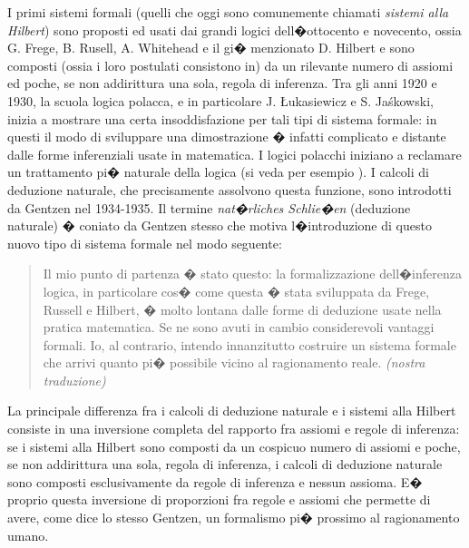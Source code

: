\documentclass[a4paper,12pt]{aphex}
\begin{document}
I primi sistemi formali (quelli che oggi sono comunemente chiamati \emph{sistemi alla Hilbert}) sono proposti ed usati dai grandi logici dell�ottocento e novecento, ossia G. Frege, B. Rusell, A. Whitehead e il gi� menzionato D. Hilbert e  sono composti (ossia i loro postulati consistono in) da un rilevante numero di assiomi ed poche, se non addirittura una sola, regola di inferenza. Tra gli anni 1920 e 1930, la scuola logica polacca, e in particolare J. \L{}ukasiewicz e S. Ja\'skowski, inizia a mostrare una certa insoddisfazione per tali tipi di sistema formale: in questi il modo di sviluppare una dimostrazione � infatti complicato e distante dalle forme   inferenziali usate in matematica. I logici polacchi iniziano a reclamare un trattamento pi� naturale della logica (si veda per esempio \cite{anellis}).  I calcoli di deduzione naturale, che precisamente assolvono questa funzione, sono introdotti da Gentzen nel 1934-1935. Il termine \emph{nat�rliches Schlie�en} (deduzione naturale) � coniato da Gentzen stesso che motiva l�introduzione di questo nuovo tipo di sistema formale nel modo seguente:

\begin{quotation}
Il mio punto di partenza � stato questo: la formalizzazione dell�inferenza logica, in particolare cos� come questa � stata sviluppata da Frege, Russell e Hilbert, � molto lontana dalle forme di deduzione usate nella pratica matematica. Se ne sono avuti in cambio considerevoli vantaggi formali. Io, al contrario, intendo innanzitutto costruire un sistema formale che arrivi quanto pi� possibile  vicino al ragionamento reale. \cite[p. 68]{gentzen} \emph{(nostra traduzione)}
\end{quotation}


La principale differenza fra i calcoli di deduzione naturale e i sistemi alla Hilbert consiste in una inversione completa del rapporto fra assiomi e regole di inferenza: se i sistemi alla Hilbert sono composti da un cospicuo numero di assiomi e poche, se non addirittura una sola, regola di inferenza, i calcoli di deduzione naturale sono composti esclusivamente da regole di inferenza e nessun assioma. E� proprio questa inversione di proporzioni fra regole e assiomi che permette di avere, come dice lo stesso Gentzen, un formalismo pi�  prossimo al ragionamento umano. 

\end{document}
